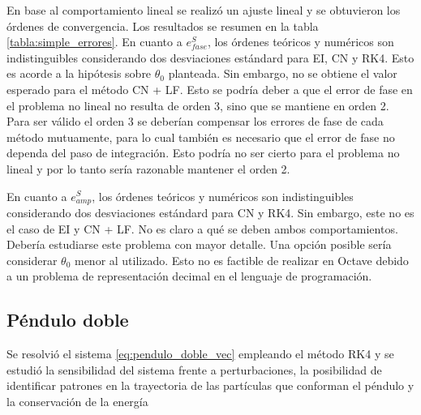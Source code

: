 \documentclass[aps,prb,twocolumn,superscriptaddress,floatfix,longbibliography,10pt]{revtex4-2}
\newcounter{para}
\begin{document}
\twocolumngrid


\hfill

En base al comportamiento lineal se realizó un ajuste lineal y se obtuvieron los órdenes de convergencia. Los resultados se resumen en la tabla \ref{tabla:simple_errores}. En cuanto a $e^S_{fase}$, los órdenes teóricos y numéricos son indistinguibles considerando dos desviaciones estándard para EI, CN y RK4. Esto es acorde a la hipótesis sobre $\theta_0$ planteada. Sin embargo, no se obtiene el valor esperado para el método CN + LF. Esto se podría deber a que el error de fase en el problema no lineal no resulta de orden 3, sino que se mantiene en orden 2. Para ser válido el orden 3 se deberían compensar los errores de fase de cada método mutuamente, para lo cual también es necesario que el error de fase no dependa del paso de integración. Esto podría no ser cierto para el problema no lineal y por lo tanto sería razonable mantener el orden 2.

En cuanto a $e^S_{amp}$, los órdenes teóricos y numéricos son indistinguibles considerando dos desviaciones estándard para CN y RK4. Sin embargo, este no es el caso de EI y CN + LF. No es claro a qué se deben ambos comportamientos. Debería estudiarse este problema con mayor detalle. Una opción posible sería considerar $\theta_0$ menor al utilizado. Esto no es factible de realizar en Octave debido a un problema de representación decimal en el lenguaje de programación.





\subsection{Péndulo doble}

Se resolvió el sistema \ref{eq:pendulo_doble_vec} empleando el método RK4 y se estudió la sensibilidad del sistema frente a perturbaciones, la posibilidad de identificar patrones en la trayectoria de las partículas que conforman el péndulo y la conservación de la energía
\end{document}
